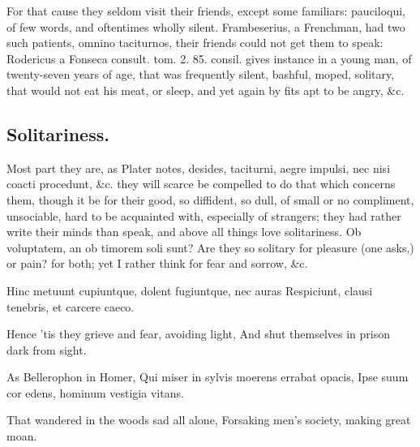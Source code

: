 {For that cause they seldom visit their friends, except some familiars:
pauciloqui, of few words, and oftentimes wholly silent. 
Frambeserius, a Frenchman, had two such patients, omnino taciturnos,
their friends could not get them to speak: Rodericus a Fonseca consult.
tom. 2. 85. consil. gives instance in a young man, of twenty-seven
years of age, that was frequently silent, bashful, moped, solitary,
that would not eat his meat, or sleep, and yet again by fits apt to be
angry, \&c.

\subsection{Solitariness.}
Most part they are, as Plater notes, desides,
taciturni, aegre impulsi, nec nisi coacti procedunt, \&c. they will
scarce be compelled to do that which concerns them, though it be for
their good, so diffident, so dull, of small or no compliment,
unsociable, hard to be acquainted with, especially of strangers; they
had rather write their minds than speak, and above all things love
solitariness. Ob voluptatem, an ob timorem soli sunt? Are they so
solitary for pleasure (one asks,) or pain? for both; yet I rather think
for fear and sorrow, \&c.

Hinc metuunt cupiuntque, dolent fugiuntque, nec auras
Respiciunt, clausi tenebris, et carcere caeco.

Hence 'tis they grieve and fear, avoiding light,
And shut themselves in prison dark from sight.

As Bellerophon in Homer,
Qui miser in sylvis moerens errabat opacis,
Ipse suum cor edens, hominum vestigia vitans.

That wandered in the woods sad all alone,
Forsaking men's society, making great moan.

}
